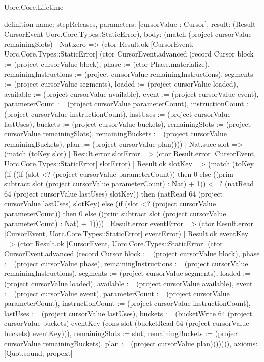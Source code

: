 \begin{lexlean}{Uorc.Core.Lifetime}
\begin{semanticmodule}
definition{
  name: stepReleases,
  parameters: [cursorValue : Cursor],
  result: (Result CursorEvent Uorc.Core.Types::StaticError),
  body: (match (project cursorValue remainingSlots)
    | Nat.zero => (ctor Result.ok [CursorEvent, Uorc.Core.Types::StaticError] (ctor CursorEvent.advanced (record Cursor {block := (project cursorValue block), phase := (ctor Phase.materialize), remainingInstructions := (project cursorValue remainingInstructions), segments := (project cursorValue segments), loaded := (project cursorValue loaded), available := (project cursorValue available), event := (project cursorValue event), parameterCount := (project cursorValue parameterCount), instructionCount := (project cursorValue instructionCount), lastUses := (project cursorValue lastUses), buckets := (project cursorValue buckets), remainingSlots := (project cursorValue remainingSlots), remainingBuckets := (project cursorValue remainingBuckets), plan := (project cursorValue plan)})))
    | Nat.succ slot => (match (toKey slot)
      | Result.error slotError => (ctor Result.error [CursorEvent, Uorc.Core.Types::StaticError] slotError)
      | Result.ok slotKey => (match (toKey (if ((if (slot <? (project cursorValue parameterCount)) then 0 else ((prim subtract slot (project cursorValue parameterCount) : Nat) + 1)) <=? (natRead 64 (project cursorValue lastUses) slotKey)) then (natRead 64 (project cursorValue lastUses) slotKey) else (if (slot <? (project cursorValue parameterCount)) then 0 else ((prim subtract slot (project cursorValue parameterCount) : Nat) + 1))))
        | Result.error eventError => (ctor Result.error [CursorEvent, Uorc.Core.Types::StaticError] eventError)
        | Result.ok eventKey => (ctor Result.ok [CursorEvent, Uorc.Core.Types::StaticError] (ctor CursorEvent.advanced (record Cursor {block := (project cursorValue block), phase := (project cursorValue phase), remainingInstructions := (project cursorValue remainingInstructions), segments := (project cursorValue segments), loaded := (project cursorValue loaded), available := (project cursorValue available), event := (project cursorValue event), parameterCount := (project cursorValue parameterCount), instructionCount := (project cursorValue instructionCount), lastUses := (project cursorValue lastUses), buckets := (bucketWrite 64 (project cursorValue buckets) eventKey (cons slot (bucketRead 64 (project cursorValue buckets) eventKey))), remainingSlots := slot, remainingBuckets := (project cursorValue remainingBuckets), plan := (project cursorValue plan)})))))),
  axioms: [Quot.sound, propext]
}


\end{semanticmodule}
\end{lexlean}
